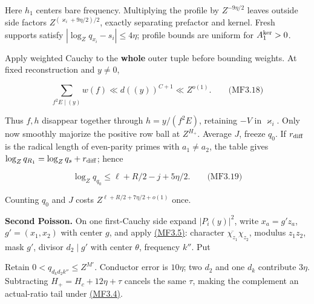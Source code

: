 Here \(h_1\) centers bare frequency. Multiplying the profile by \(Z^{-9\eta/2}\) leaves outside side factors \(Z^{(\varkappa_i+9\eta/2)/2}\), exactly separating prefactor and kernel. Fresh supports satisfy \(|\log_Zq_{x_i}-s_i|\le4\eta\); profile bounds are uniform for \(A_1^{\rm ker}>0\).

Apply weighted Cauchy to the \textbf{whole} outer tuple before bounding weights. At fixed reconstruction and \(y\ne0\),

\hypertarget{mf:eq:B3.18}{}

\label{mf:eq:B3.18}

\[
\sum_{f^2E\mid(y)}w(f)\ll d((y))^{C+1}\ll Z^{o(1)}.
\qquad\text{(MF3.18)}
\]

Thus \(f,h\) disappear together through \(h=y/(f^2E)\), retaining \(-V\) in \(\varkappa_i\). Only now smoothly majorize the positive row ball at \(Z^{H_+}\). Average \(J\), freeze \(q_0\). If \(r_{\rm diff}\) is the radical length of even-parity primes with \(a_1\ne a_2\), the table gives \(\log_Zq_{R_1}=\log_Zq_s+r_{\rm diff}\); hence

\hypertarget{mf:eq:B3.19}{}

\label{mf:eq:B3.19}

\[
\log_Zq_{q_0}\le\ell+R/2-j+5\eta/2.
\qquad\text{(MF3.19)}
\]

Counting \(q_0\) and \(J\) costs \(Z^{\ell+R/2+7\eta/2+o(1)}\) once.

\textbf{Second Poisson.} On one first-Cauchy side expand \(|P_i(y)|^2\), write \(x_a=g'z_a\), \(g'=(x_1,x_2)\) with center \(g\), and apply \protect\hyperlink{mf:eq:B3.5}{(MF3.5)}: character \(\overline{\chi_{z_1}}\chi_{z_2}\), modulus \(z_1z_2\), mask \(g'\), divisor \(d_2\mid g'\) with center \(\theta\), frequency \(k''\). Put

\hypertarget{mf:eq:B3.20}{}

\label{mf:eq:B3.20}

\par\noindent\resizebox{\linewidth}{!}{\begin{minipage}{\dimexpr\linewidth+50.12982pt\relax}\[
\lambda_c=H_c-\theta-(s_i-g),\qquad
M_c=2(s_i-g)-H_c+\delta+2\theta
=M-4\ell-2A_i-2t-2g+2\theta-2V+j,
\quad M'=M_c+\eta.
\qquad\text{(MF3.20)}
\]\end{minipage}}\par

Retain \(0<q_{d_kd_2k''}\le Z^{M'}\). Conductor error is \(10\eta\); two \(d_2\) and one \(d_k\) contribute \(3\eta\). Subtracting \(H_+=H_c+12\eta+\tau\) cancels the same \(\tau\), making the complement an actual-ratio tail under \protect\hyperlink{mf:eq:B3.4}{(MF3.4)}.

